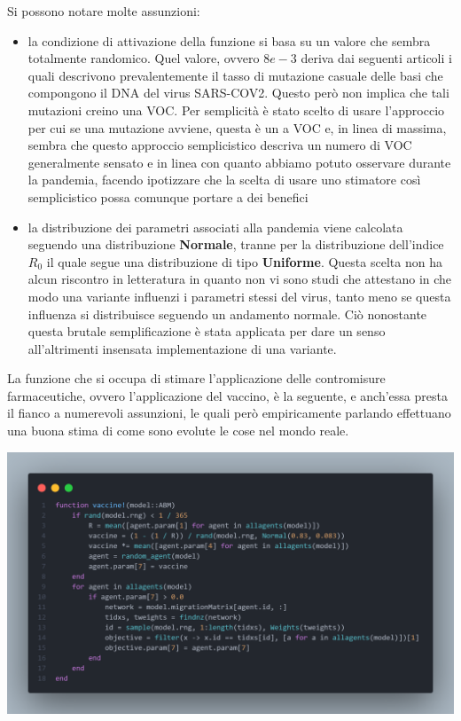 Si possono notare molte assunzioni:
\begin{itemize}
	\item la condizione di attivazione della funzione si basa su un valore
	che sembra totalmente randomico. Quel valore, ovvero $8e-3$ deriva dai
	seguenti articoli \cite{Markov2023} \cite{https://doi.org/10.1002/jmv.27331} \cite{Abavisani2022}
	i quali descrivono prevalentemente il tasso di mutazione casuale delle basi che compongono
	il DNA del virus SARS-COV2. Questo però non implica che tali mutazioni 
	creino una VOC. Per semplicità è stato scelto di usare l'approccio per cui
	se una mutazione avviene, questa è un a VOC e, in linea di massima, sembra che 
	questo approccio semplicistico descriva un numero di VOC generalmente sensato e 
	in linea con quanto abbiamo potuto osservare durante la pandemia, facendo ipotizzare che 
	la scelta di usare uno stimatore così semplicistico possa comunque portare a dei benefici
	\item la distribuzione dei parametri associati alla pandemia viene calcolata
	seguendo una distribuzione \textbf{Normale}, tranne per la distribuzione dell'indice $R_0$
	il quale segue una distribuzione di tipo \textbf{Uniforme}.
	Questa scelta non ha alcun riscontro in letteratura in quanto non vi sono studi 
	che attestano in che modo una variante influenzi i parametri stessi del virus, 
	tanto meno se questa influenza si distribuisce seguendo un andamento normale. 
	Ciò nonostante questa brutale semplificazione è stata applicata per dare un senso 
	all'altrimenti insensata implementazione di una variante.
\end{itemize}

La funzione che si occupa di stimare l'applicazione delle contromisure farmaceutiche, 
ovvero l'applicazione del vaccino, è la seguente, e anch'essa presta il fianco 
a numerevoli assunzioni, le quali però empiricamente parlando
effettuano una buona stima di come sono evolute le cose nel mondo reale.

\begin{minipage}{\linewidth}
	\centering
	\includegraphics[width=\textwidth]{img/vaccine.png}
	\label{fig:vaccine}
\end{minipage}

